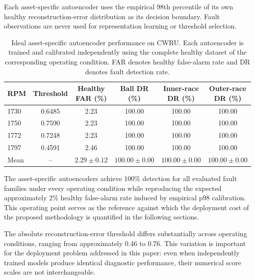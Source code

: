 \documentclass[numbered]{trbunofficial}
\begin{document}
Each asset-specific autoencoder uses the empirical 98th percentile of its
own healthy reconstruction-error distribution as its decision boundary.
Fault observations are never used for representation learning or threshold
selection.

\begin{table}[!ht]
\centering
\caption{Ideal asset-specific autoencoder performance on CWRU. Each 
autoencoder is trained and calibrated independently using the complete
healthy dataset of the corresponding operating condition. FAR denotes 
healthy false-alarm rate and DR denotes fault detection rate.}
\label{tab:asset-specific-by-condition}

\begin{tabular}{lccccc}
\toprule
RPM &
Threshold &
Healthy FAR (\%) &
Ball DR (\%) &
Inner-race DR (\%) &
Outer-race DR (\%)\\
\midrule

1730 &
0.6485 &
2.23 &
100.00 &
100.00 &
100.00 \\

1750 &
0.7590 &
2.23 &
100.00 &
100.00 &
100.00 \\

1772 &
0.7248 &
2.23 &
100.00 &
100.00 &
100.00 \\

1797 &
0.4591 &
2.46 &
100.00 &
100.00 &
100.00 \\

\midrule

Mean &
-- &
$2.29 \pm 0.12$ &
$100.00 \pm 0.00$ &
$100.00 \pm 0.00$ &
$100.00 \pm 0.00$ \\

\bottomrule
\end{tabular}
\end{table}

The asset-specific autoencoders achieve 100\% detection for all evaluated
fault families under every operating condition while reproducing the
expected approximately 2\% healthy false-alarm rate induced by empirical
p98 calibration. This operating point serves as the reference against which
the deployment cost of the proposed methodology is quantified in the
following sections.

The absolute reconstruction-error threshold differs substantially across
operating conditions, ranging from approximately 0.46 to 0.76. This
variation is important for the deployment problem addressed in this paper:
even when independently trained models produce identical diagnostic
performance, their numerical score scales are not interchangeable.
\end{document}
